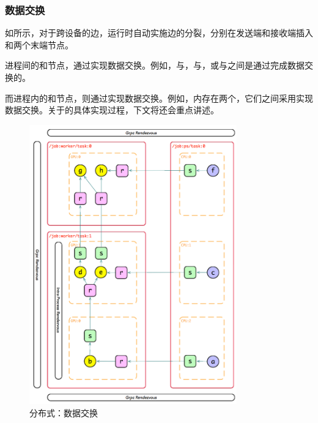 \begin{content}
\subsubsection{数据交换}

如所示，对于跨设备的边，运行时自动实施边的分裂，分别在发送端和接收端插入和两个末端节点。

进程间的和节点，通过实现数据交换。例如，与，与，或与之间是通过完成数据交换的。

而进程内的和节点，则通过实现数据交换。例如，内存在两个，它们之间采用实现数据交换。关于的具体实现过程，下文将还会重点讲述。

\begin{figure}[H]
\centering
\includegraphics[width=0.8\textwidth]{figures/dist-exp-2.png}
\caption{分布式：数据交换}
 \label{fig:dist-exp-2}
\end{figure}


\end{content}

